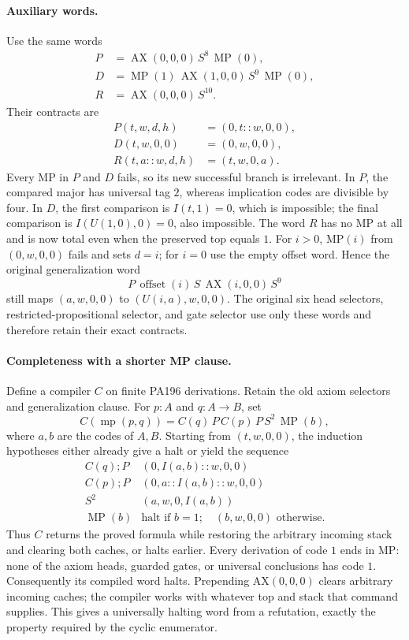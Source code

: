 \paragraph{Auxiliary words.}
Use the same words
\[
\begin{split}
 P&=\operatorname{AX}(0,0,0)\,S^8\,\operatorname{MP}(0),\\
 D&=\operatorname{MP}(1)\,\operatorname{AX}(1,0,0)\,S^9\,
       \operatorname{MP}(0),\\
 R&=\operatorname{AX}(0,0,0)\,S^{10}.
\end{split}
\]
Their contracts are
\[
\begin{split}
 P(t,w,d,h)&=(0,t::w,0,0),\\
 D(t,w,0,0)&=(0,w,0,0),\\
 R(t,a::w,d,h)&=(t,w,0,a).
\end{split}
\]
Every MP in $P$ and $D$ fails, so its new successful branch is irrelevant.
In $P$, the compared major has universal tag $2$, whereas implication
codes are divisible by four.  In $D$, the first comparison is
$I(t,1)=0$, which is impossible; the final comparison is
$I(U(1,0),0)=0$, also impossible.  The word $R$ has no MP at all and
is now total even when the preserved top equals $1$.
For $i>0$, MP$(i)$ from $(0,w,0,0)$ fails and sets $d=i$; for $i=0$
use the empty offset word.  Hence the original generalization word
\[
 P\,\operatorname{offset}(i)\,S\,\operatorname{AX}(i,0,0)\,S^9
\]
still maps $(a,w,0,0)$ to $(U(i,a),w,0,0)$.  The original six head
selectors, restricted-propositional selector, and gate selector use only
these words and therefore retain their exact contracts.

\paragraph{Completeness with a shorter MP clause.}
Define a compiler $C$ on finite PA196 derivations.  Retain the old axiom
selectors and generalization clause.  For $p:A$ and $q:A\to B$, set
\[
 C(\operatorname{mp}(p,q))
   =C(q)\,P\,C(p)\,P\,S^2\,\operatorname{MP}(b),
\]
where $a,b$ are the codes of $A,B$.  Starting from $(t,w,0,0)$, the
induction hypotheses either already give a halt or yield the sequence
\[
\begin{array}{c|c}
 C(q);P &(0,I(a,b)::w,0,0)\\
 C(p);P &(0,a::I(a,b)::w,0,0)\\
 S^2 &(a,w,0,I(a,b))\\
 \operatorname{MP}(b)&
       \text{halt if }b=1;\quad(b,w,0,0)\text{ otherwise.}
\end{array}
\]
Thus $C$ returns the proved formula while restoring the arbitrary incoming
stack and clearing both caches, or halts earlier.  Every derivation of code
$1$ ends in MP: none of the axiom heads, guarded gates, or universal
conclusions has code $1$.  Consequently its compiled word halts.
Prepending AX$(0,0,0)$ clears arbitrary incoming caches; the compiler works
with whatever top and stack that command supplies.  This gives a universally
halting word from a refutation, exactly the property required by the cyclic
enumerator.

